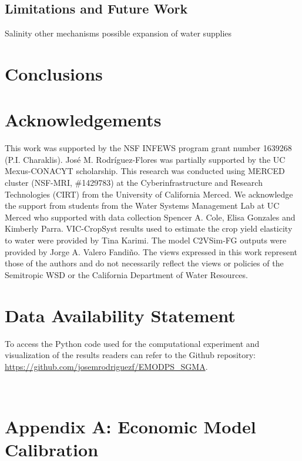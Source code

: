 \documentclass[11pt,a4paper]{article}
\begin{document}
\subsection{Limitations and Future Work}

Salinity other mechanisms possible expansion of water supplies 

\section{Conclusions}

\section*{Acknowledgements}

This work was supported by the NSF INFEWS program grant number 1639268 (P.I. Charaklis). José M. Rodríguez-Flores was partially supported by the UC Mexus-CONACYT scholarship. This research was conducted using MERCED cluster (NSF-MRI, \#1429783) at the Cyberinfrastructure and Research Technologies (CIRT) from the University of California Merced. We acknowledge the support from students from the Water Systems Management Lab at UC Merced who supported with data collection Spencer A. Cole, Elisa Gonzales and Kimberly Parra. VIC-CropSyst results used to estimate the crop yield elasticity to water were provided by Tina Karimi. The model C2VSim-FG outputs were provided by Jorge A. Valero Fandiño. The views expressed in this work represent those of the authors and do not necessarily reflect the views or policies of the Semitropic WSD or the California Department of Water Resources.

\section*{Data Availability Statement}

To access the Python code used for the computational experiment and  visualization of the results readers can refer to the Github repository: \url{https://github.com/josemrodriguezf/EMODPS_SGMA}.

\newpage
\appendix
\renewcommand\thefigure{\thesection.\arabic{figure}} 
\setcounter{figure}{0}  
\renewcommand{\theequation}{\thesection.\arabic{equation}}\
\setcounter{equation}{0} 
\renewcommand{\thetable}{\thesection.\arabic{table}}\
\setcounter{table}{0} 

\section{Appendix A: Economic Model Calibration}
\end{document}

